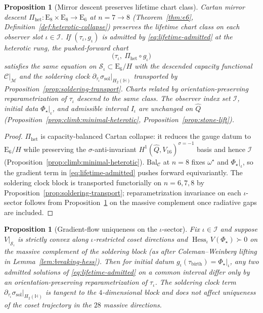 \documentclass[aps,prd,onecolumn,amsmath,amssymb,nofootinbib,11pt]{revtex4-2}
\numberwithin{equation}{section}
\theoremstyle{plain}
\newtheorem{proposition}[theorem]{Proposition}
\theoremstyle{definition}
\theoremstyle{remark}
\newcommand{\Quat}{\mathbb{H}}
\newcommand{\E}[1]{\mathrm{E}_{#1}}
\newcommand{\capacity}{\mathcal{C}}
\newcommand{\orderparam}{\Phi}
\newcommand{\Hess}{\operatorname{Hess}}
\begin{document}
\begin{proposition}[Mirror descent preserves lifetime chart class]
\label{prop:lifetime-descent}
Cartan mirror descent $\Pi_{\mathrm{het}}:\E{8}\times\E{8}\to\E{6}$ at
$n=7\to8$ (Theorem~\ref{thm:e6}, Definition~\ref{def:heterotic-collapse})
preserves the lifetime chart \emph{class} on each observer slot
$\iota\in\mathcal{I}$. If $(\tau_\iota,g_\iota)$ is admitted by
\eqref{eq:lifetime-admitted} at the heterotic rung, the pushed-forward chart
\begin{equation}\label{eq:lifetime-descent}
  \bigl(\tau_\iota,\ \Pi_{\mathrm{het}}\circ g_\iota\bigr)
\end{equation}
satisfies the same equation on $\mathcal{S}_\iota\subset\E{6}/H$ with the
descended capacity functional $\capacity|_{\mathcal{M}}$ and the soldering clock
$\partial_{\tau_\iota}\sigma_{\mathrm{sol}}|_{H_2(\Quat)}$ transported by
Proposition~\ref{prop:soldering-transport}. Charts related by
orientation-preserving reparametrization of $\tau_\iota$ descend to the same
class. The observer index set $\mathcal{I}$, initial data
$\orderparam_\star|_\iota$, and admissible interval $I_\iota$ are unchanged on
$\hat Q$ (Proposition~\ref{prop:climb:minimal-heterotic},
Proposition~\ref{prop:stone-lift}).
\end{proposition}

\begin{proof}
$\Pi_{\mathrm{het}}$ is capacity-balanced Cartan collapse: it reduces the
gauge datum to $\E{6}/H$ while preserving the $\sigma$-anti-invariant
$H^1(\hat Q,V_{16})^{\sigma=-1}$ basis and hence $\mathcal{I}$
(Proposition~\ref{prop:climb:minimal-heterotic}). $\mathrm{Bal}_{\mathcal{C}}$
at $n=8$ fixes $\omega^\star$ and $\orderparam_\star|_\iota$, so the gradient
term in \eqref{eq:lifetime-admitted} pushes forward equivariantly. The
soldering clock block is transported functorially on $n=6,7,8$ by
Proposition~\ref{prop:soldering-transport}; reparametrization invariance on
each $\iota$-sector follows from Proposition~\ref{prop:lifetime-flow-unique}
on the massive complement once radiative gaps are included.
\end{proof}

\begin{proposition}[Gradient-flow uniqueness on the $\iota$-sector]
\label{prop:lifetime-flow-unique}
Fix $\iota\in\mathcal{I}$ and suppose $V|_{\mathcal{S}_\iota}$ is strictly
convex along $\iota$-restricted coset directions and
$\Hess_\iota V(\orderparam_\star)\succ 0$ on the massive complement of the
soldering block (as after Coleman--Weinberg lifting in
Lemma~\ref{lem:breaking-hess}). Then for initial datum
$g_\iota(\tau_{\mathrm{birth}})=\orderparam_\star|_\iota$, any two admitted
solutions of \eqref{eq:lifetime-admitted} on a common interval differ only
by an orientation-preserving reparametrization of $\tau_\iota$. The soldering
clock term $\partial_{\tau_\iota}\sigma_{\mathrm{sol}}|_{H_2(\Quat)}$ is
tangent to the $4$-dimensional block and does not affect uniqueness of the
coset trajectory in the $28$ massive directions.
\end{proposition}
\end{document}
